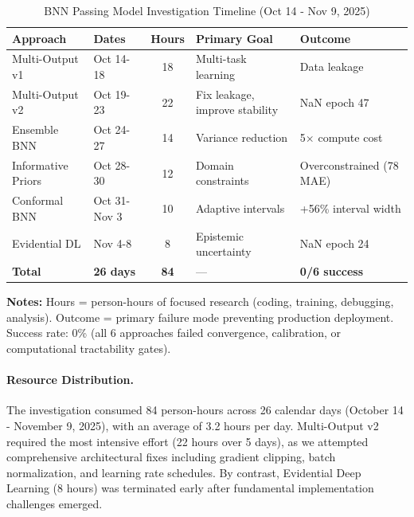 \begin{table}[htbp]
\centering
\caption{BNN Passing Model Investigation Timeline (Oct 14 - Nov 9, 2025)}
\label{tab:bnn-timeline}
\small
\begin{adjustbox}{max width=\textwidth}
\begin{tabular}{@{} l l S[table-format=2.0] l l @{}}
\toprule
\textbf{Approach} & \textbf{Dates} & \textbf{Hours} & \textbf{Primary Goal} & \textbf{Outcome} \\
\midrule
Multi-Output v1 & Oct 14-18 & 18 & Multi-task learning & Data leakage \\
Multi-Output v2 & Oct 19-23 & 22 & Fix leakage, improve stability & NaN epoch 47 \\
Ensemble BNN & Oct 24-27 & 14 & Variance reduction & 5$\times$ compute cost \\
Informative Priors & Oct 28-30 & 12 & Domain constraints & Overconstrained (78 MAE) \\
Conformal BNN & Oct 31-Nov 3 & 10 & Adaptive intervals & +56\% interval width \\
Evidential DL & Nov 4-8 & 8 & Epistemic uncertainty & NaN epoch 24 \\
\baselinerule
\textbf{Total} & \textbf{26 days} & \textbf{84} & --- & \textbf{0/6 success} \\
\bottomrule
\end{tabular}
\end{adjustbox}

\vspace{2mm}
\begin{minipage}{\linewidth}
\small
\textbf{Notes:} Hours = person-hours of focused research (coding, training, debugging, analysis). Outcome = primary failure mode preventing production deployment. Success rate: 0\% (all 6 approaches failed convergence, calibration, or computational tractability gates).
\end{minipage}
\end{table}

\paragraph{Resource Distribution.}
The investigation consumed 84 person-hours across 26 calendar days (October 14 - November 9, 2025), with an average of 3.2 hours per day. Multi-Output v2 required the most intensive effort (22 hours over 5 days), as we attempted comprehensive architectural fixes including gradient clipping, batch normalization, and learning rate schedules. By contrast, Evidential Deep Learning (8 hours) was terminated early after fundamental implementation challenges emerged.

